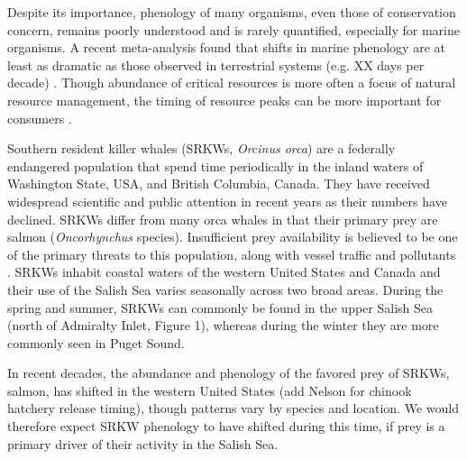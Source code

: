 \documentclass{article}
\begin{document}
\par Despite its importance, phenology of many organisms, even those of conservation concern, remains poorly understood and is rarely quantified, especially for marine organisms. A recent meta-analysis found that shifts in marine phenology are at least as dramatic as those observed in terrestrial systems (e.g. XX days per decade) \citep{poloczanska2013}. Though abundance of critical resources is more often a focus of natural resource management, the timing of resource peaks can be more important for consumers \citep{hipfner2008}.
\par Southern resident killer whales (SRKWs, \emph{Orcinus orca}) are a federally endangered population that spend time periodically in the inland waters of Washington State, USA, and British Columbia, Canada.  They have received widespread scientific and public attention in recent years as their numbers have declined\citep[e.g., seattle times articles,][]{lusseau2009,larson2018, olson2018}. SRKWs differ from many orca whales in that their primary prey are salmon (\emph{Oncorhynchus} species).  Insufficient prey availability is believed to be one of the primary threats to this population, along with vessel traffic and pollutants \citep{krahn2007,lusseau2009,hanson2010}. SRKWs inhabit coastal waters of the western United States and Canada and their use of the Salish Sea varies seasonally across two broad areas. During the spring and summer, SRKWs can commonly be found in the upper Salish Sea (north of Admiralty Inlet, Figure 1), whereas during the winter they are more commonly seen in  Puget Sound.%
\par In recent decades, the abundance and phenology of the favored prey of SRKWs, salmon, has shifted in the western United States \citep{weinheimer2017,reed2011,ford2006,satterthwaite2014}(add Nelson for chinook hatchery release timing), though patterns vary by species and location. We would therefore expect SRKW phenology to have shifted during this time, if prey is a primary driver of their activity in the Salish Sea. %
\end{document}
